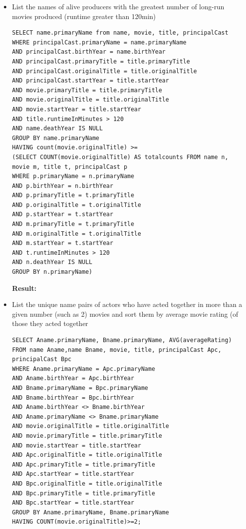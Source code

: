 \documentclass{sig-alternate}
\begin{document}
\begin{itemize}
\begin{figure}[ht]
		    \label{frontend}
		    \centering
	        \end{figure}
		\item List the names of alive producers with the greatest number of long-run movies produced (runtime greater than 120min)
                \begin{lstlisting}
SELECT name.primaryName from name, movie, title, principalCast
WHERE principalCast.primaryName = name.primaryName
AND principalCast.birthYear = name.birthYear
AND principalCast.primaryTitle = title.primaryTitle
AND principalCast.originalTitle = title.originalTitle
AND principalCast.startYear = title.startYear
AND movie.primaryTitle = title.primaryTitle
AND movie.originalTitle = title.originalTitle
AND movie.startYear = title.startYear
AND title.runtimeInMinutes > 120
AND name.deathYear IS NULL
GROUP BY name.primaryName
HAVING count(movie.originalTitle) >=
(SELECT COUNT(movie.originalTitle) AS totalcounts FROM name n, movie m, title t, principalCast p
WHERE p.primaryName = n.primaryName
AND p.birthYear = n.birthYear
AND p.primaryTitle = t.primaryTitle
AND p.originalTitle = t.originalTitle
AND p.startYear = t.startYear
AND m.primaryTitle = t.primaryTitle
AND m.originalTitle = t.originalTitle
AND m.startYear = t.startYear
AND t.runtimeInMinutes > 120
AND n.deathYear IS NULL
GROUP BY n.primaryName)
                \end{lstlisting}
                \textbf{Result:}
		\item List the unique name pairs of actors who have acted together in more than a given number (such as 2)  movies and sort them by average movie rating (of those they acted together
                \begin{lstlisting}
SELECT Aname.primaryName, Bname.primaryName, AVG(averageRating)
FROM name Aname,name Bname, movie, title, principalCast Apc, principalCast Bpc
WHERE Aname.primaryName = Apc.primaryName 
AND Aname.birthYear = Apc.birthYear 
AND Bname.primaryName = Bpc.primaryName 
AND Bname.birthYear = Bpc.birthYear
AND Aname.birthYear <> Bname.birthYear 
AND Aname.primaryName <> Bname.primaryName
AND movie.originalTitle = title.originalTitle 
AND movie.primaryTitle = title.primaryTitle
AND movie.startYear = title.startYear 
AND Apc.originalTitle = title.originalTitle 
AND Apc.primaryTitle = title.primaryTitle 
AND Apc.startYear = title.startYear 
AND Bpc.originalTitle = title.originalTitle 
AND Bpc.primaryTitle = title.primaryTitle
AND Bpc.startYear = title.startYear 
GROUP BY Aname.primaryName, Bname.primaryName
HAVING COUNT(movie.originalTitle)>=2;

\end{lstlisting}
\end{itemize}
\end{document}
